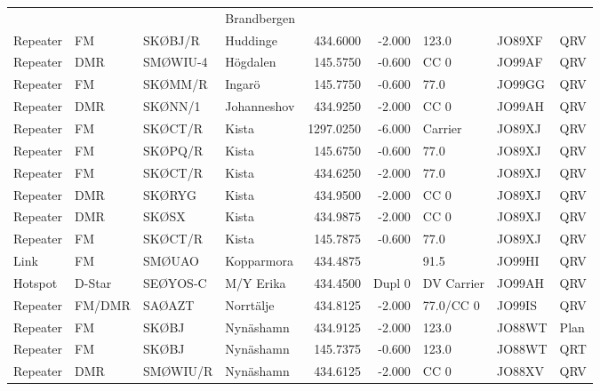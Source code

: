 \begin{longtable}{llllrrlll}
         &             &          & Brandbergen &              &            &            &             &          \\
Repeater & FM          & SKØBJ/R  & Huddinge    & 434.6000     & -2.000     & 123.0      & JO89XF      & QRV      \\
Repeater & DMR         & SMØWIU-4 & Högdalen    & 145.5750     & -0.600     & CC 0       & JO99AF      & QRV      \\
Repeater & FM          & SKØMM/R  & Ingarö      & 145.7750     & -0.600     & 77.0       & JO99GG      & QRV      \\
Repeater & DMR         & SKØNN/1  & Johanneshov & 434.9250     & -2.000     & CC 0       & JO99AH      & QRV      \\
Repeater & FM          & SKØCT/R  & Kista       & 1297.0250    & -6.000     & Carrier    & JO89XJ      & QRV      \\
Repeater & FM          & SKØPQ/R  & Kista       & 145.6750     & -0.600     & 77.0       & JO89XJ      & QRV      \\
Repeater & FM          & SKØCT/R  & Kista       & 434.6250     & -2.000     & 77.0       & JO89XJ      & QRV      \\
Repeater & DMR         & SKØRYG   & Kista       & 434.9500     & -2.000     & CC 0       & JO89XJ      & QRV      \\
Repeater & DMR         & SKØSX    & Kista       & 434.9875     & -2.000     & CC 0       & JO89XJ      & QRV      \\
Repeater & FM          & SKØCT/R  & Kista       & 145.7875     & -0.600     & 77.0       & JO89XJ      & QRV      \\
Link     & FM          & SMØUAO   & Kopparmora  & 434.4875     &            & 91.5       & JO99HI      & QRV      \\
Hotspot  & D-Star      & SEØYOS-C & M/Y Erika   & 434.4500     & Dupl 0     & DV Carrier & JO99AH      & QRV      \\
Repeater & FM/DMR      & SAØAZT   & Norrtälje   & 434.8125     & -2.000     & 77.0/CC 0  & JO99IS      & QRV      \\
Repeater & FM          & SKØBJ    & Nynäshamn   & 434.9125     & -2.000     & 123.0      & JO88WT      & Plan     \\
Repeater & FM          & SKØBJ    & Nynäshamn   & 145.7375     & -0.600     & 123.0      & JO88WT      & QRT      \\
Repeater & DMR         & SMØWIU/R & Nynäshamn   & 434.6125     & -2.000     & CC 0       & JO88XV      & QRV      \\

\end{longtable}
